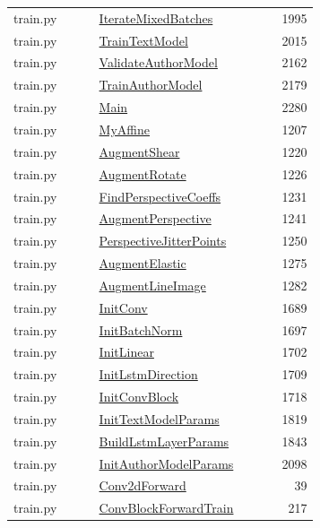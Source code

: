 \documentclass[11pt,a4paper,oneside]{report}
\begin{document}
\begin{longtable}{p{0.28\linewidth}p{0.48\linewidth}r}
train.py & \hyperref[fn:train:IterateMixedBatches]{IterateMixedBatches} & 1995\\
train.py & \hyperref[fn:train:TrainTextModel]{TrainTextModel} & 2015\\
train.py & \hyperref[fn:train:ValidateAuthorModel]{ValidateAuthorModel} & 2162\\
train.py & \hyperref[fn:train:TrainAuthorModel]{TrainAuthorModel} & 2179\\
train.py & \hyperref[fn:train:Main]{Main} & 2280\\
train.py & \hyperref[fn:train:MyAffine]{MyAffine} & 1207\\
train.py & \hyperref[fn:train:AugmentShear]{AugmentShear} & 1220\\
train.py & \hyperref[fn:train:AugmentRotate]{AugmentRotate} & 1226\\
train.py & \hyperref[fn:train:FindPerspectiveCoeffs]{FindPerspectiveCoeffs} & 1231\\
train.py & \hyperref[fn:train:AugmentPerspective]{AugmentPerspective} & 1241\\
train.py & \hyperref[fn:train:PerspectiveJitterPoints]{PerspectiveJitterPoints} & 1250\\
train.py & \hyperref[fn:train:AugmentElastic]{AugmentElastic} & 1275\\
train.py & \hyperref[fn:train:AugmentLineImage]{AugmentLineImage} & 1282\\
train.py & \hyperref[fn:train:InitConv]{InitConv} & 1689\\
train.py & \hyperref[fn:train:InitBatchNorm]{InitBatchNorm} & 1697\\
train.py & \hyperref[fn:train:InitLinear]{InitLinear} & 1702\\
train.py & \hyperref[fn:train:InitLstmDirection]{InitLstmDirection} & 1709\\
train.py & \hyperref[fn:train:InitConvBlock]{InitConvBlock} & 1718\\
train.py & \hyperref[fn:train:InitTextModelParams]{InitTextModelParams} & 1819\\
train.py & \hyperref[fn:train:BuildLstmLayerParams]{BuildLstmLayerParams} & 1843\\
train.py & \hyperref[fn:train:InitAuthorModelParams]{InitAuthorModelParams} & 2098\\
train.py & \hyperref[fn:train:Conv2dForward]{Conv2dForward} & 39\\
train.py & \hyperref[fn:train:ConvBlockForwardTrain]{ConvBlockForwardTrain} & 217\\

\end{longtable}
\end{document}
